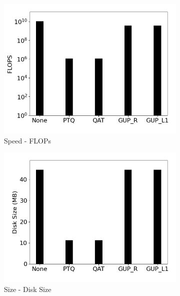 \begin{figure}[]
\begin{subfigure}{0.19\textwidth}
        \includegraphics[width=1\textwidth]{other/figures/Resnet18_ImageNet1k_PC/FLOPS.png}
        \caption{Speed - FLOPs}
    \end{subfigure}
    \begin{subfigure}{0.19\textwidth}
        \includegraphics[width=1\textwidth]{other/figures/Resnet18_ImageNet1k_PC/Size.png}
        \caption{Size - Disk Size}
    \end{subfigure}
    \begin{subfigure}{0.19\textwidth}

\end{subfigure}
\end{figure}
